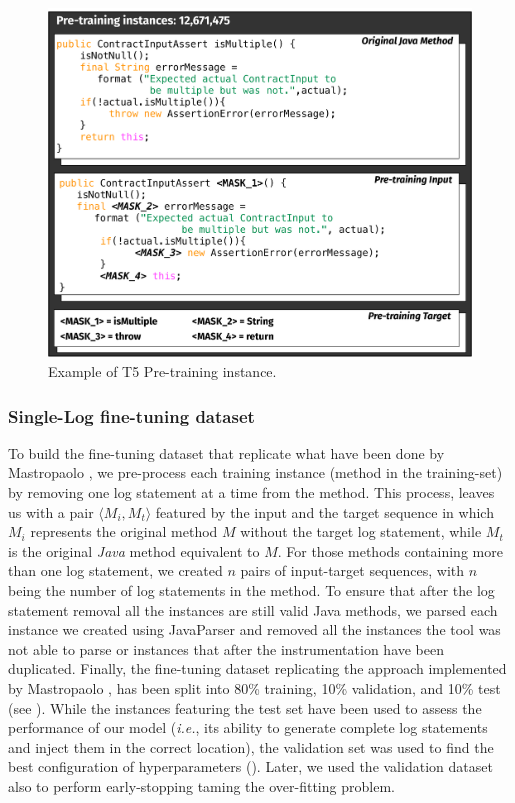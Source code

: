 \begin{figure}[h!]
	\label{fig:pre-training}
	\includegraphics[width=\columnwidth]{img/pre-training.pdf}
		\caption{Example of T5 Pre-training instance.}
\end{figure}




\subsubsection{Single-Log fine-tuning dataset} \label{sec:single-log-dataset}
To build the fine-tuning dataset that replicate what have been done by Mastropaolo \etal \cite{mastropaolo2022using}, we pre-process each training instance (\ie \java method in the training-set) by removing one log statement at a time from the \java method. This process, leaves us with a pair $\langle M_i, M_t \rangle$ featured by the input and the target sequence in which $M_i$ represents the original \java method $M$ without the target log statement, while $M_t$ is the original \emph{Java} method equivalent to $M$. For those methods containing more than one log statement, we created $n$ pairs of input-target sequences, with $n$ being the number of log statements in the method. To ensure that after the log statement removal all the instances are still valid Java methods, we parsed each instance we created using JavaParser \cite{javaparser} and removed all the instances the tool was not able to parse or instances that after the instrumentation have been duplicated. Finally, the fine-tuning dataset replicating the approach implemented by Mastropaolo \etal \cite{mastropaolo2022using}, has been split into 80\% training, 10\% validation, and 10\% test (see ). 
While the instances featuring the test set have been used to assess the performance of our model (\emph{i.e.}, its ability to generate complete log statements and inject them in the correct location), the validation set was used to find the best configuration of hyperparameters (). Later, we used the validation dataset also to perform early-stopping taming the over-fitting problem.

